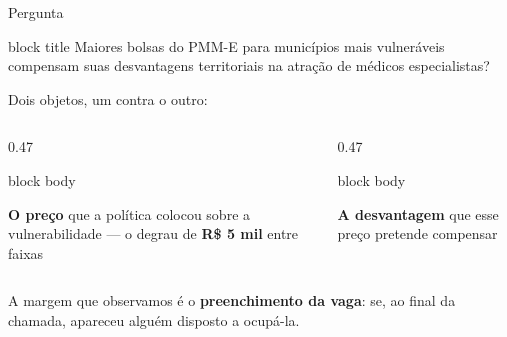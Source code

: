 \documentclass[aspectratio=169,11pt]{beamer}
\def\rastreiotexto{}
\newcommand{\rastreio}[1]{\gdef\rastreiotexto{#1}}
\newcommand{\lead}[1]{{\color{verdeEscuro}\bfseries #1}}
\newenvironment{destaque}[1][0.95\textwidth]%
  {\begin{center}\begin{beamercolorbox}[wd=#1,sep=0.8em,rounded=true]{block title}\centering}%
  {\end{beamercolorbox}\end{center}}
\begin{document}
\begin{frame}{Pergunta}
  \vspace{1.0em}
  \begin{destaque}
    \large Maiores bolsas do PMM-E para municípios mais vulneráveis
    compensam suas desvantagens territoriais na atração de médicos
    especialistas?
  \end{destaque}

  \vspace{1.2em}
  {\small Dois objetos, um contra o outro:}

  \vspace{0.6em}
  \begin{columns}[T]
    \begin{column}{0.47\textwidth}
      \begin{beamercolorbox}[wd=\textwidth,sep=0.75em,rounded=true]{block body}
        \begin{minipage}[t][3.0em][c]{\dimexpr\textwidth-1.5em\relax}
          \small\textbf{O preço} que a política colocou sobre a
          vulnerabilidade --- o degrau de \textbf{R\$ 5 mil} entre faixas
        \end{minipage}
      \end{beamercolorbox}
    \end{column}
    \begin{column}{0.47\textwidth}
      \begin{beamercolorbox}[wd=\textwidth,sep=0.75em,rounded=true]{block body}
        \begin{minipage}[t][3.0em][c]{\dimexpr\textwidth-1.5em\relax}
          \small\textbf{A desvantagem} que esse preço pretende compensar
        \end{minipage}
      \end{beamercolorbox}
    \end{column}
  \end{columns}

  \vspace{1.0em}
  {\small A margem que observamos é o \lead{preenchimento da vaga}: se, ao
  final da chamada, apareceu alguém disposto a ocupá-la.}
\end{frame}

\rastreio{3. Literatura teórica \textperiodcentered\ 1 de 2}
\end{document}
